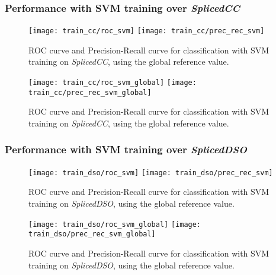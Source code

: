 \subsubsection{Performance with SVM training over \emph{SplicedCC}}

\begin{figure}[!htb]
  \texttt{[image: train\_cc/roc\_svm]}
\endminipage\hfill
{}
  \texttt{[image: train\_cc/prec\_rec\_svm]}
\endminipage
\caption{ROC curve and Precision-Recall curve for classification with SVM training on \emph{SplicedCC}, using the global reference value.}\label{fig:regiondetnormal}
\end{figure}

\begin{figure}[!htb]
  \texttt{[image: train\_cc/roc\_svm\_global]}
\endminipage\hfill
{}
  \texttt{[image: train\_cc/prec\_rec\_svm\_global]}
\endminipage
\caption{ROC curve and Precision-Recall curve for classification with SVM training on \emph{SplicedCC}, using the global reference value.}\label{fig:regiondetnormal}
\end{figure}

\subsubsection{Performance with SVM training over \emph{SplicedDSO}}

\begin{figure}[!htb]
  \texttt{[image: train\_dso/roc\_svm]}
\endminipage\hfill
{}
  \texttt{[image: train\_dso/prec\_rec\_svm]}
\endminipage
\caption{ROC curve and Precision-Recall curve for classification with SVM training on \emph{SplicedDSO}, using the global reference value.}\label{fig:regiondetnormal}
\end{figure}

\begin{figure}[!htb]
  \texttt{[image: train\_dso/roc\_svm\_global]}
\endminipage\hfill
{}
  \texttt{[image: train\_dso/prec\_rec\_svm\_global]}
\endminipage
\caption{ROC curve and Precision-Recall curve for classification with SVM training on \emph{SplicedDSO}, using the global reference value.}\label{fig:regiondetnormal}
\end{figure}



